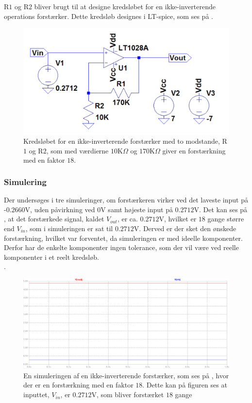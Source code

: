 \noindent R$1$ og R$2$ bliver brugt til at designe kredsløbet for en ikke-inverterende operations forstærker. Dette kredsløb designes i LT-spice, som ses på . 
\begin{figure}[H]
\centering
\includegraphics[scale=0.5]{figures/cProblemloesning/Forstaerker_faktor18.PNG}
\caption{Kredsløbet for en ikke-inverterende forstærker med to modstande, R$1$ og R$2$, som med værdierne $10$K$\Omega$ og $170$K$\Omega$ giver en forstærkning med en faktor $18$.}
\label{fig:Forstaerker_faktor18}
\end{figure} 

\subsubsection{Simulering}\label{Subsec:Forstaerker_simu}
Der undersøges i tre simuleringer, om forstærkeren virker ved det laveste input på -$0.2660$V, uden påvirkning ved $0$V samt højeste input på $0.2712$V. Det kan ses på , at det forstærkede signal, kaldet $V_{out}$, er ca. $0.2712$V, hvilket er $18$ gange større end $V_{in}$, som i simuleringen er sat til $0.2712$V. Derved er der sket den ønskede forstærkning, hvilket var forventet, da simuleringen er med ideelle komponenter. Derfor har de enkelte komponenter ingen tolerance, som der vil være ved reelle komponenter i et reelt kredsløb. \\. 

\begin{figure}[H]
\centering
\includegraphics[scale=0.4]{figures/cProblemloesning/Forstaerker_faktor18_simulering.PNG}
\caption{En simuleringen af en ikke-inverterende forstærker, som ses på , hvor der er en forstærkning med en faktor $18$. Dette kan på figuren ses at inputtet, $V_{in}$, er $0.2712$V, som bliver forstærket $18$ gange}
\label{fig:Forstaerker_faktor18_simulering}
\end{figure}

